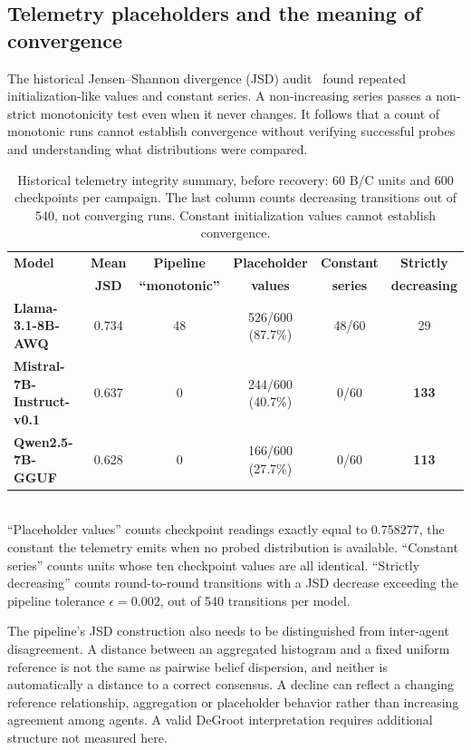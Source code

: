 \subsection{Telemetry placeholders and the meaning of convergence}
\label{sec:jsd_convergence}
The historical Jensen--Shannon divergence (JSD) audit~\cite{lin1991jsd} found repeated initialization-like values and constant series. A non-increasing series passes a non-strict monotonicity test even when it never changes. It follows that a count of monotonic runs cannot establish convergence without verifying successful probes and understanding what distributions were compared.
\begin{table}[!htbp]
\centering
\caption{Historical telemetry integrity summary, before recovery: 60 B/C units and 600 checkpoints per campaign. The last column counts decreasing transitions out of 540, not converging runs. Constant initialization values cannot establish convergence.}
\label{tab:convergence_jsd}
\small
\begin{tabular}{lccccc}
\toprule
\textbf{Model} & \textbf{Mean} & \textbf{Pipeline} & \textbf{Placeholder} & \textbf{Constant} & \textbf{Strictly} \\
 & \textbf{JSD} & \textbf{``monotonic''} & \textbf{values} & \textbf{series} & \textbf{decreasing} \\
\midrule
\textbf{Llama-3.1-8B-AWQ} & 0.734 & 48 & 526/600 (87.7\%) & 48/60 & 29 \\
\textbf{Mistral-7B-Instruct-v0.1}   & 0.637 & 0  & 244/600 (40.7\%) & 0/60  & \textbf{133} \\
\textbf{Qwen2.5-7B-GGUF}  & 0.628 & 0  & 166/600 (27.7\%) & 0/60  & \textbf{113} \\
\bottomrule
\end{tabular}
\smallskip\\
\footnotesize ``Placeholder values'' counts checkpoint readings exactly equal to $0.758277$, the constant the telemetry emits when no probed distribution is available. ``Constant series'' counts units whose ten checkpoint values are all identical. ``Strictly decreasing'' counts round-to-round transitions with a JSD decrease exceeding the pipeline tolerance $\epsilon = 0.002$, out of 540 transitions per model.
\end{table}

The pipeline's JSD construction also needs to be distinguished from inter-agent disagreement. A distance between an aggregated histogram and a fixed uniform reference is not the same as pairwise belief dispersion, and neither is automatically a distance to a correct consensus. A decline can reflect a changing reference relationship, aggregation or placeholder behavior rather than increasing agreement among agents. A valid DeGroot interpretation requires additional structure not measured here.

